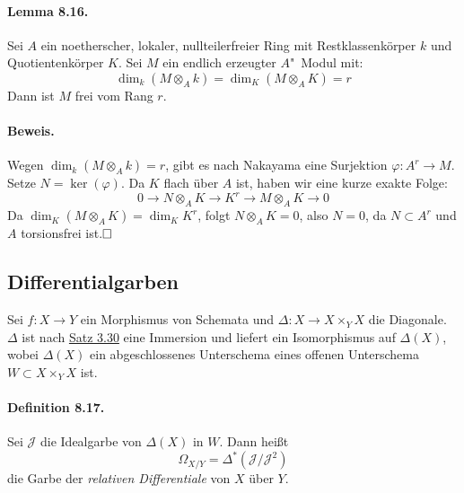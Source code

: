 \documentclass[11pt,b5paper,openany]{memoir}
\def \qed {$\hfill\square$}
\begin{document}
\paragraph{Lemma 8.16.}\label{8.16} Sei $A$ ein noetherscher, lokaler, nullteilerfreier Ring mit Restklassenkörper $k$ und Quotientenkörper $K$. Sei $M$ ein endlich erzeugter $A$"~Modul mit:
\[\dim_k(M\otimes_Ak)=\dim_K(M\otimes_AK)=r \]
Dann ist $M$ frei vom Rang $r$.

\paragraph{Beweis.} Wegen $\dim_k(M\otimes_Ak)=r$, gibt es nach Nakayama eine Surjektion $\varphi:A^r\to M$. Setze $N=\ker(\varphi)$. Da $K$ flach über $A$ ist, haben wir eine kurze exakte Folge:
\[0\longrightarrow N\otimes_AK\longrightarrow K^r\longrightarrow M\otimes_AK\longrightarrow 0 \]
Da $\dim_K(M\otimes_AK)=\dim_KK^r$, folgt $N\otimes_AK=0$, also $N=0$, da $N\subset A^r$ und $A$ torsionsfrei ist.\qed

\subsection{Differentialgarben}

Sei $f:X\to Y$ ein Morphismus von Schemata und $\Delta:X\to X\times_YX$ die Diagonale. $\Delta$ ist nach \hyperref[3.30]{Satz 3.30} eine Immersion und liefert ein Isomorphismus auf $\Delta(X)$, wobei $\Delta(X)$ ein abgeschlossenes Unterschema eines offenen Unterschema $W\subset X\times_YX$ ist.

\paragraph{Definition 8.17.}\label{8.17} Sei $\mathcal{J}$ die Idealgarbe von $\Delta(X)$ in $W$. Dann heißt
\[\Omega_{X/Y}=\Delta^\ast(\mathcal{J}/\mathcal{J}^2) \]
die Garbe der \textit{relativen Differentiale} von $X$ über $Y$.
\end{document}
